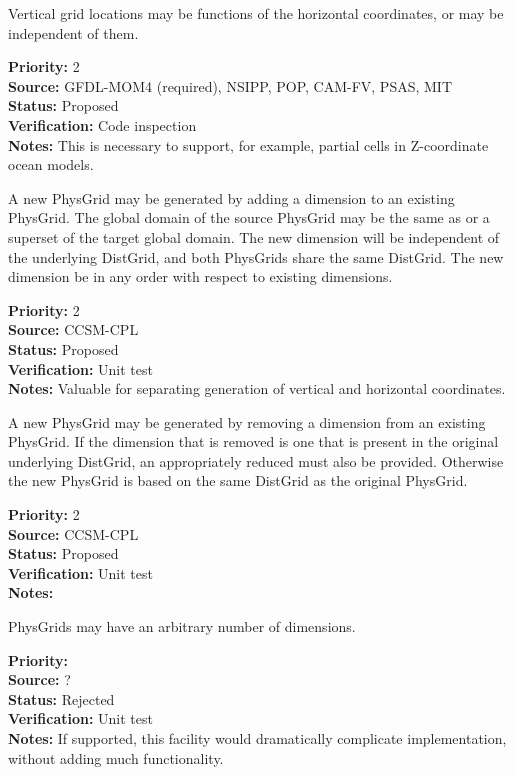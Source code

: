 Vertical grid locations may be functions of the horizontal coordinates, or may be
independent of them.
\begin{reqlist}
{\bf Priority:} 2 \\
{\bf Source:} GFDL-MOM4 (required), NSIPP, POP, 
              CAM-FV, PSAS, MIT \\
{\bf Status:} Proposed \\
{\bf Verification:} Code inspection\\
{\bf Notes:} This is necessary to support, for example, partial cells in
Z-coordinate ocean models.
\end{reqlist}

A new PhysGrid may be generated by adding a dimension to an existing PhysGrid.
The global domain of the source PhysGrid may be the same as or a superset of
the target global domain.  The new dimension will be independent of the underlying
DistGrid, and both PhysGrids share the same DistGrid.  The new dimension be in any
order with respect to existing dimensions.
\begin{reqlist}
{\bf Priority:} 2 \\
{\bf Source:} CCSM-CPL \\
{\bf Status:} Proposed \\
{\bf Verification:} Unit test\\
{\bf Notes:} Valuable for separating generation of vertical and horizontal
coordinates.
\end{reqlist}

A new PhysGrid may be generated by removing a dimension from an existing PhysGrid.
If the dimension that is removed is one that is present in the original underlying
DistGrid, an appropriately reduced must also be provided.  Otherwise the new PhysGrid
is based on the same DistGrid as the original PhysGrid.
\begin{reqlist}
{\bf Priority:} 2 \\
{\bf Source:} CCSM-CPL \\
{\bf Status:} Proposed \\
{\bf Verification:} Unit test\\
{\bf Notes:} 
\end{reqlist}

PhysGrids may have an arbitrary number of dimensions. 
\begin{reqlist}
{\bf Priority:} \\
{\bf Source:} ? \\
{\bf Status:} Rejected\\
{\bf Verification:} Unit test\\
{\bf Notes:} If supported, this facility would dramatically complicate implementation,
without adding much functionality.
\end{reqlist}

